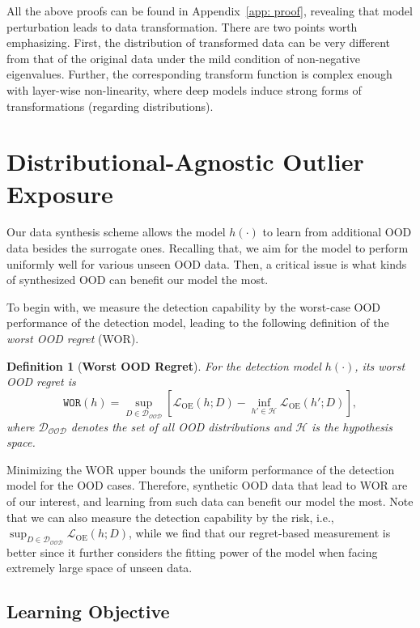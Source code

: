 \documentclass{article} \usepackage{iclr2022_conference,times}
\newtheorem{definition}{Definition}
\begin{document}
All the above proofs can be found in Appendix~\ref{app: proof}, revealing that model perturbation leads to data transformation. There are two points worth emphasizing. First, the distribution of transformed data can be very different from that of the original data under the mild condition of non-negative eigenvalues. Further, the corresponding transform function is complex enough with layer-wise non-linearity, where deep models induce strong forms of transformations (regarding distributions). 


\section{Distributional-Agnostic Outlier Exposure}
\label{sec: doe}

Our data synthesis scheme allows the model $h(\cdot)$ to learn from additional OOD data besides the surrogate ones. Recalling that, we aim for the model to perform uniformly well for various unseen OOD data. Then, a critical issue is what kinds of synthesized OOD can benefit our model the most.

To begin with, we measure the detection capability by the worst-case OOD performance of the detection model, leading to the following definition of the \emph{worst OOD regret} (WOR). 
\begin{definition}[\textbf{Worst OOD Regret}] \label{def: wor}
For the detection model $h(\cdot)$, its worst OOD regret is
\begin{equation}
    \texttt{WOR}(h) = \sup_{D\in\mathcal{D_\text{OOD}}} \left[ {\mathcal{L}}_\text{OE} (h; D) - \inf_{h'\in\mathcal{H}} {\mathcal{L}}_\text{OE} (h'; D) \right], \label{eq: wor}
\end{equation}
where $\mathcal{D_\text{OOD}}$ denotes the set of all OOD distributions and $\mathcal{H}$ is the hypothesis space. 
\end{definition}
Minimizing the WOR upper bounds the uniform performance of the detection model for the OOD cases. Therefore, synthetic OOD data that lead to WOR are of our interest, and learning from such data can benefit our model the most. Note that we can also measure the detection capability by the risk, i.e., $ \sup_{D\in\mathcal{D_\text{OOD}}} {\mathcal{L}}_\text{OE} (h; D)$, while we find that our regret-based measurement is better since it further considers the fitting power of the model when facing extremely large space of unseen data. 



\subsection{Learning Objective}
\end{document}

